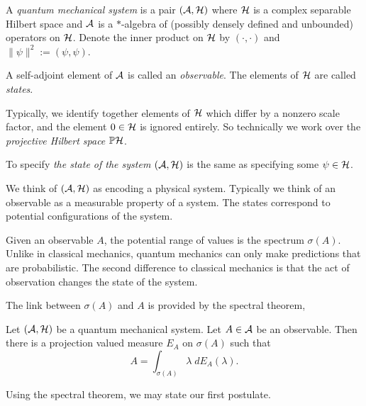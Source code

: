 \begin{definition}
    A \emph{quantum mechanical system} is a pair $(\mathcal{A},\mathcal{H})$ where $\mathcal{H}$
    is a complex separable Hilbert space and $\mathcal{A}$ is a $*$-algebra
    of (possibly densely defined and unbounded) operators on $\mathcal{H}$. 
    Denote the inner product on $\mathcal{H}$ by $(\cdot,\cdot)$
    and $\|\psi\|^2 := (\psi,\psi)$.
    
    
    A self-adjoint element of $\mathcal{A}$ is called an \emph{observable}. 
    The elements of $\mathcal{H}$ are called \emph{states}. 
    
    Typically, we identify together elements of $\mathcal{H}$
    which differ by a nonzero scale factor, and the element $0 \in \mathcal{H}$
    is ignored entirely. So technically we work over the \emph{projective
    Hilbert space} $\mathbb{P}\mathcal{H}$.
    
    To specify \emph{the state of the system} $(\mathcal{A},\mathcal{H})$ is the same
    as specifying some $\psi \in \mathcal{H}$.
\end{definition}

We think of $(\mathcal{A},\mathcal{H})$ as encoding a physical system. 
Typically we think of an observable as a measurable
property of a system. The states correspond to potential
configurations of the system.

Given an observable $A$, the potential range
of values is the spectrum $\sigma(A)$. Unlike in classical mechanics,
quantum mechanics can only make predictions that are probabilistic.
The second difference to classical mechanics is that the act of observation changes
the state of the system.

The link
between $\sigma(A)$ and $A$ is provided by the spectral theorem,
\begin{theorem}
    Let $(\mathcal{A},\mathcal{H})$ be a quantum mechanical system. Let $A \in \mathcal{A}$ be an observable.
    Then there is a projection valued measure $E_A$ on $\sigma(A)$ such that
    \begin{equation*}
        A = \int_{\sigma(A)} \lambda\;dE_A(\lambda).
    \end{equation*}
\end{theorem}

Using the spectral theorem, we may state our first postulate.

